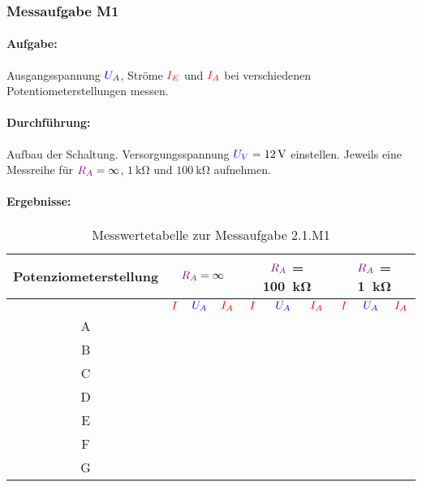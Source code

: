 \documentclass[11pt,a4paper,titlepage,parskip=half]{scrreprt}
\begin{document}
        \subsubsection{Messaufgabe M1}
          \paragraph{Aufgabe:} Ausgangsspannung $\textcolor{blue}{U_A}$, Ströme $\textcolor{red}{I_E}$ und $\textcolor{red}{I_A}$ bei verschiedenen Potentiometerstellungen
          messen.
          \paragraph{Durchführung:}Aufbau der Schaltung. Versorgungsspannung $\textcolor{blue}{U_V} = \SI{12}{\volt}$ einstellen. Jeweils eine
          Messreihe für $\textcolor{violet}{R_A} = \infty$, $\SI{1}{\kilo\ohm}$ und $\SI{100}{\kilo\ohm}$ aufnehmen.
          \paragraph{Ergebnisse:}
            \begin{center}
              \begin{table}[H]
                \caption{Messwertetabelle zur Messaufgabe 2.1.M1}
                \label{tbl:messergebnisse1.1}
                \renewcommand{\arraystretch}{1.5}
                \begin{tabular}{c|c|c|c|c|c|c|c|c|c}
                  Potenziometerstellung & \multicolumn{3}{c|}{\textbf{$\textcolor{violet}{R_A} = \infty$}} & \multicolumn{3}{c|}{\textbf{$\textcolor{violet}{R_A}$ = \SI{100}{\kilo\ohm}}}& \multicolumn{3}{c}{\textbf{$\textcolor{violet}{R_A}$ = \SI{1}{\kilo\ohm}}}\\ \hline
                                & $\textcolor{red}{I}$ & $\textcolor{blue}{U_A}$ & $\textcolor{red}{I_A}$ & $\textcolor{red}{I}$ & $\textcolor{blue}{U_A}$ & $\textcolor{red}{I_A}$ & $\textcolor{red}{I}$ & $\textcolor{blue}{U_A}$ & $\textcolor{red}{I_A}$\\\hline
                                A & \quad\quad\quad   & \quad\quad\quad & \quad\quad\quad & \quad\quad\quad &\quad\quad\quad  &\quad\quad\quad  & \quad\quad\quad & \quad\quad\quad &\quad\quad\quad \\\hline
                                B &  & &  &  &  &  &  & & \\\hline
                                C & & & & & & & & & \\\hline
                                D & & & & & & & & & \\\hline
                                E & &  &  & &  & & &  & \\\hline
                                F & & & & & & & & & \\\hline
                                G & & & & & & & & & \\
                \end{tabular}
              \end{table}
            \end{center}
\end{document}
